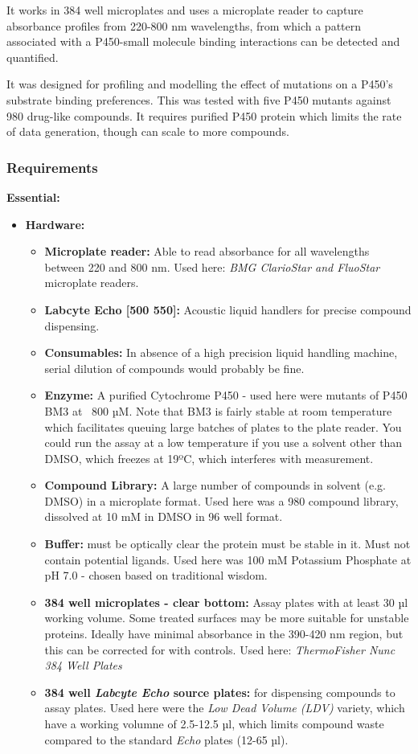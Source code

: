 \documentclass[16pt]{book}
\begin{document}
It works in 384 well microplates and uses a microplate reader to capture absorbance profiles from 220-800 nm wavelengths, from which a pattern associated with a P450-small molecule binding interactions can be detected and quantified.  

It was designed for profiling and modelling the effect of mutations on a P450's substrate binding preferences.
This was tested with five P450 mutants against 980 drug-like compounds.
It requires purified P450 protein which limits the rate of data generation, though can scale to more compounds.


\subsubsection{Requirements}

\textbf{Essential:}

\begin{itemize}
\item \textbf{Hardware:}
	\begin{itemize}
	\item \textbf{Microplate reader:} Able to read absorbance for all wavelengths between 220 and 800 nm.
		Used here: \textit{BMG ClarioStar and FluoStar} microplate readers.
	\item \textbf{Labcyte Echo [500 550]:} Acoustic liquid handlers for precise compound dispensing.
\item \textbf{Consumables:}
	In absence of a high precision liquid handling machine, serial dilution of compounds would probably be fine.
	\item \textbf{Enzyme:} A purified Cytochrome P450 - used here were mutants of P450 BM3 at ~800 µM. 
	Note that BM3 is fairly stable at room temperature which facilitates queuing large batches of plates to the plate reader.
	You could run the assay at a low temperature if you use a solvent other than DMSO, which freezes at 19ºC, which interferes with measurement.
	\item \textbf{Compound Library:} A large number of compounds in solvent (e.g. DMSO) in a microplate format.
	Used here was a 980 compound library, dissolved at 10 mM in DMSO in 96 well format.
	\item \textbf{Buffer:} must be optically clear the protein must be stable in it.
	Must not contain potential ligands.
	Used here was 100 mM Potassium Phosphate at pH 7.0 - chosen based on traditional wisdom.
	\item \textbf{384 well microplates - clear bottom:}
	Assay plates with at least 30 µl working volume. 
	Some treated surfaces may be more suitable for unstable proteins.
	Ideally have minimal absorbance in the 390-420 nm region, but this can be corrected for with controls.
	Used here: \textit{ThermoFisher Nunc 384 Well Plates}
	\item \textbf{384 well \textit{Labcyte Echo} source plates:} for dispensing compounds to assay plates. 
	Used here were the \textit{Low Dead Volume (LDV)} variety, which have a working volumne of 2.5-12.5 µl, 
	which limits compound waste compared to the standard \textit{Echo} plates (12-65 µl).
	\end{itemize}
\end{itemize}
\end{document}
